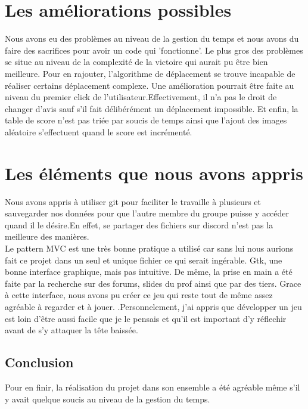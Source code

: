 \documentclass[a4paper, 11pt, oneside]{article}
\begin{document}
\section{Les améliorations possibles}
Nous avons eu des problèmes au niveau de la gestion du temps et nous avons du faire des sacrifices pour avoir un code qui 'fonctionne'. Le plus gros des problèmes se situe au niveau de la complexité de la victoire qui aurait pu être bien meilleure. Pour en rajouter, l'algorithme de déplacement se trouve incapable de réaliser certains déplacement complexe. Une amélioration pourrait être faite au niveau du premier click de l'utilisateur.Effectivement, il n'a pas le droit de changer d'avis sauf s'il fait délibérément un déplacement impossible.
Et enfin, la table de score n'est pas triée par soucis de temps ainsi que l'ajout des images aléatoire s'effectuent quand le score est incrémenté.

\section{Les éléments que nous avons appris}
Nous avons appris à utiliser git pour faciliter le travaille à plusieurs et sauvegarder nos données pour que l'autre membre du groupe puisse y accéder quand il le désire.En effet, se partager des fichiers sur discord n'est pas la meilleure des manières.\\
Le pattern MVC est une très bonne pratique a utilisé car sans lui nous aurions fait ce projet dans un seul et unique fichier ce qui serait ingérable.
Gtk, une bonne interface graphique, mais pas intuitive. De même, la prise en main a été faite par la recherche sur des forums, slides du prof ainsi que par des tiers. Grace à cette interface, nous avons pu créer ce jeu qui reste tout de même assez agréable à regarder et à jouer.
.Personnelement, j'ai appris que développer un jeu est loin d'être aussi facile que je le pensais et qu'il est important d'y réflechir avant de s'y attaquer la tête baissée.
\subsection{Conclusion}
Pour en finir, la réalisation du projet dans son ensemble a été agréable même s'il y avait quelque soucis au niveau de la gestion du temps.
\end{document}
